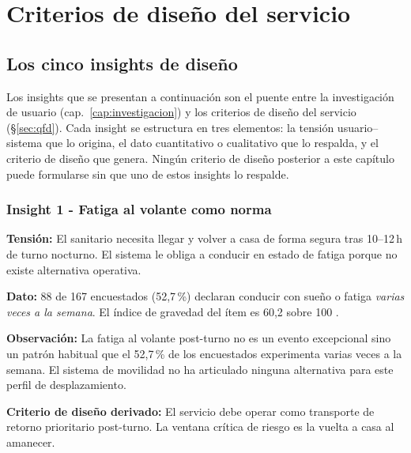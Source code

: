\section{Criterios de diseño del servicio}\label{sec:estrategias}

\subsection{Los cinco insights de diseño}
\label{sec:insights-diseno}

Los insights que se presentan a continuación son el puente entre
la investigación de usuario (cap.~\ref{cap:investigacion}) y los
criterios de diseño del servicio (§\ref{sec:qfd}). Cada insight
se estructura en tres elementos: la tensión usuario–sistema que
lo origina, el dato cuantitativo o cualitativo que lo respalda,
y el criterio de diseño que genera. Ningún criterio de diseño
posterior a este capítulo puede formularse sin que uno de estos
insights lo respalde.


\subsubsection{Insight 1 - Fatiga al volante como norma}
\label{sec:insight-1}

\textbf{Tensión:} El sanitario necesita llegar y volver a casa
de forma segura tras 10--12\,h de turno nocturno. El sistema
le obliga a conducir en estado de fatiga porque no existe
alternativa operativa.

\textbf{Dato:} 88 de 167 encuestados (52{,}7\,\%) declaran
conducir con sueño o fatiga \emph{varias veces a la semana}.
El índice de gravedad del ítem es 60{,}2 sobre 100
\parencite{LouridoRegueira2026}.

\textbf{Observación:} La fatiga al volante post-turno no es un evento excepcional sino un patrón habitual que el 52{,}7\,\% de los encuestados experimenta varias veces a la semana. El sistema de movilidad no ha articulado ninguna alternativa para este perfil de desplazamiento.

\textbf{Criterio de diseño derivado:} El servicio debe operar
como transporte de retorno prioritario post-turno. La ventana
crítica de riesgo es la vuelta a casa al amanecer.


